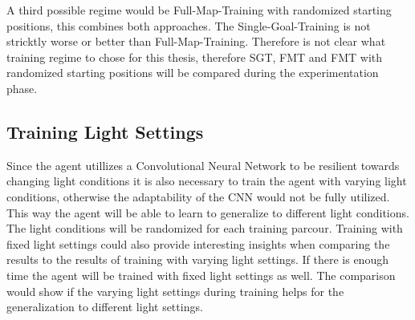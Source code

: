 A third possible regime would be Full-Map-Training with randomized starting positions, this combines both approaches. The Single-Goal-Training is not stricktly worse or better than Full-Map-Training. Therefore is not clear what training regime to chose for this thesis, therefore SGT, FMT and FMT with randomized starting positions will be compared during the experimentation phase.

\subsection*{Training Light Settings}
Since the agent utillizes a Convolutional Neural Network to be resilient towards changing light conditions it is also necessary to train the agent with varying light conditions, otherwise the adaptability of the CNN would not be fully utilized. This way the agent will be able to learn to generalize to different light conditions. The light conditions will be randomized for each training parcour.
Training with fixed light settings could also provide interesting insights when comparing the results to the results of training with varying light settings. If there is enough time the agent will be trained with fixed light settings as well. The comparison would show if the varying light settings during training helps for the generalization to different light settings.


